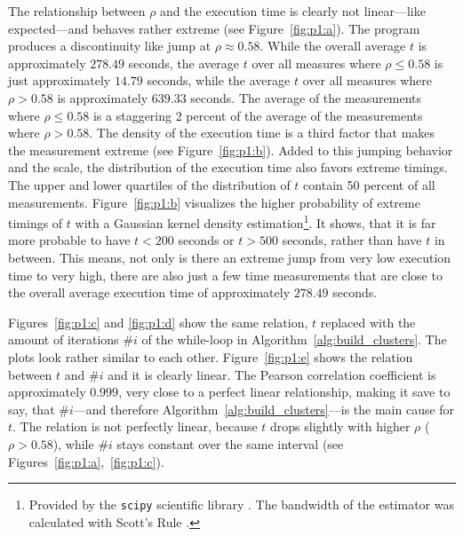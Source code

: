 \documentclass[twoside,11pt]{article}
\begin{document}
The relationship between $\rho$ and the execution time
is clearly not linear---like expected---and behaves rather
extreme (see Figure~\ref{fig:p1:a}).
The program produces a discontinuity like jump at $\rho
\approx 0.58$.
While the overall average $t$ is approximately
$278.49$ seconds, the average $t$ over all measures where
$\rho \leq 0.58$ is just approximately $14.79$ seconds,
while the average $t$ over all measures where $\rho > 0.58$
is approximately $639.33$ seconds.
The average of the measurements where $\rho \leq 0.58$ is
a staggering 2 percent of the average of the measurements
where $\rho > 0.58$.
The density of the execution time is a third factor that
makes the measurement extreme (see Figure~\ref{fig:p1:b}).
Added to this jumping behavior and the scale, the
distribution of the execution time also favors extreme
timings.
The upper and lower quartiles of the distribution of $t$
contain 50 percent of all measurements.
Figure~\ref{fig:p1:b} visualizes the higher probability of
extreme timings of $t$ with a Gaussian kernel density
estimation\footnote{Provided by the \texttt{scipy}
  scientific library \citep[see][]{scipy}. The bandwidth
  of the estimator was calculated with Scott's Rule
  \citep[see][]{scott}.}.
It shows, that it is far more probable to have $t < 200$
seconds or $t > 500$ seconds, rather than have $t$ in
between.
This means, not only is there an extreme jump from very
low execution time to very high, there are also just a
few time measurements that are close to the overall average
execution time of approximately $278.49$ seconds.

Figures~\ref{fig:p1:c} and \ref{fig:p1:d} show the same
relation, $t$ replaced with the amount of iterations $\#i$
of the while-loop in Algorithm~\ref{alg:build_clusters}.
The plots look rather similar to each other.
Figure~\ref{fig:p1:e} shows the relation between $t$ and
$\#i$ and it is clearly linear.
The Pearson correlation coefficient is approximately
$0.999$, very close to a perfect linear relationship,
making it save to say, that $\#i$---and therefore
Algorithm~\ref{alg:build_clusters}---is the main cause for
$t$.
The relation is not perfectly linear, because $t$ drops
slightly with higher $\rho$ ($\rho > 0.58$), while $\#i$
stays constant over the same interval (see
Figures~\ref{fig:p1:a},~\ref{fig:p1:c}).
\end{document}
